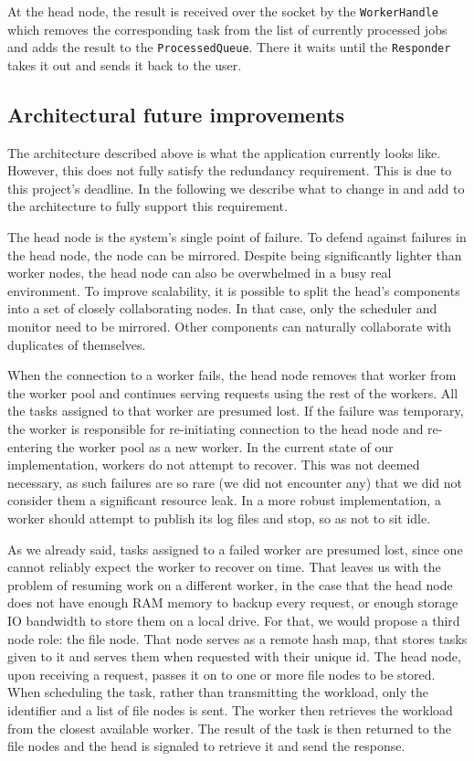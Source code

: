 \documentclass{stylesheet}
\begin{document}
At the head node, the result is received over the socket  by the \texttt{WorkerHandle} which removes the corresponding task from the list of currently processed jobs and adds the result to the \texttt{ProcessedQueue}. There it waits until the \texttt{Responder} takes it out and sends it back to the user.

\subsection{Architectural future improvements}
The architecture described above is what the application currently looks like. However, this does not fully satisfy the redundancy requirement. This is due to this project's deadline. In the following we describe what to change in and add to the architecture to fully support this requirement.

The head node is the system's single point of failure. To defend against failures in the head node, the node can be mirrored. Despite being significantly lighter than worker nodes, the head node can also be overwhelmed in a busy real environment. To improve scalability, it is possible to split the head's components into a set of closely collaborating nodes. In that case, only the scheduler and monitor need to be mirrored. Other components can naturally collaborate with duplicates of themselves.

When the connection to a worker fails, the head node removes that worker from the worker pool and continues serving requests using the rest of the workers. All the tasks assigned to that worker are presumed lost. If the failure was temporary, the worker is responsible for re-initiating connection to the head node and re-entering the worker pool as a new worker. In the current state of our implementation, workers do not attempt to recover. This was not deemed necessary, as such failures are so rare (we did not encounter any) that we did not consider them a significant resource leak. In a more robust implementation, a worker should attempt to publish its log files and stop, so as not to sit idle.

As we already said, tasks assigned to a failed worker are presumed lost, since one cannot reliably expect the worker to recover on time. That leaves us with the problem of resuming work on a different worker, in the case that the head node does not have enough RAM memory to backup every request, or enough storage IO bandwidth to store them on a local drive. For that, we would propose a third node role: the file node. That node serves as a remote hash map, that stores tasks given to it and serves them when requested with their unique id. The head node, upon receiving a request, passes it on to one or more file nodes to be stored. When scheduling the task, rather than transmitting the workload, only the identifier and a list of file nodes is sent. The worker then retrieves the workload from the closest available worker. The result of the task is then returned to the file nodes and the head is signaled to retrieve it and send the response.
\end{document}
